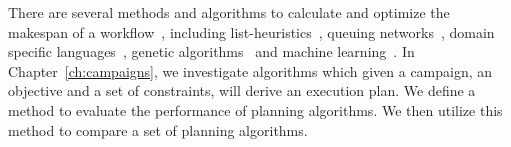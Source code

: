 There are several methods and algorithms to calculate and optimize the makespan of a workflow~\cite{lu2019review}, including list-heuristics~\cite{dong2006scheduling,list_sched_wiki}, queuing networks~\cite{yao2019throughput,bao2019performance}, domain specific languages~\cite{carothers2017durango,maheshwari2016workflow}, genetic algorithms~\cite{karla2015review} and machine learning~\cite{witt2019predictive,pumma2017runtime}.
In Chapter~\ref{ch:campaigns}, we investigate algorithms which given a campaign, an objective and a set of constraints, will derive an execution plan.
We define a method to evaluate the performance of planning algorithms.
We then utilize this method to compare a set of planning algorithms.



